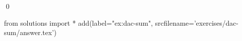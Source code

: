 
\begin{ex} 
  \label{ex:dac-sum}
  
  \qed
\end{ex} 
\begin{python0}
from solutions import *
add(label="ex:dac-sum",
    srcfilename='exercises/dac-sum/answer.tex') 
\end{python0}
